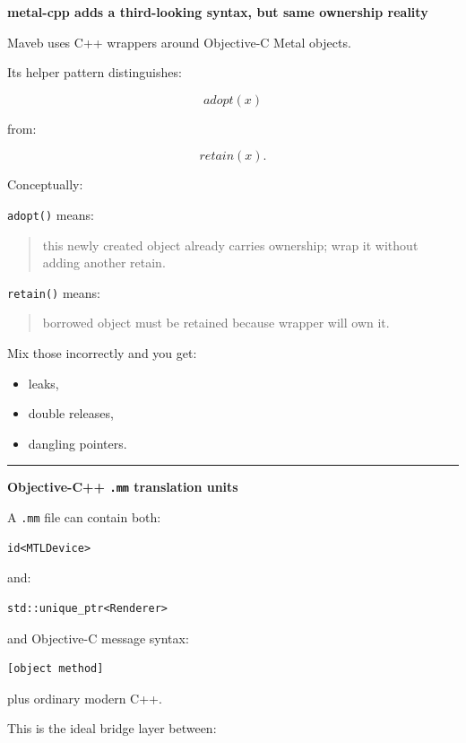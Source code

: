 \textbf{metal-cpp adds a third-looking syntax, but same ownership reality}

Maveb uses C++ wrappers around Objective-C Metal objects.

Its helper pattern distinguishes:

\[
adopt(x)
\]

from:

\[
retain(x).
\]

Conceptually:

\texttt{adopt()} means:

\begin{quote}
this newly created object already carries ownership; wrap it without adding another retain.
\end{quote}

\texttt{retain()} means:

\begin{quote}
borrowed object must be retained because wrapper will own it.
\end{quote}

Mix those incorrectly and you get:

\begin{itemize}
\tightlist
\item
  leaks,
\item
  double releases,
\item
  dangling pointers.
\end{itemize}

\begin{center}\rule{0.5\linewidth}{0.5pt}\end{center}

\textbf{Objective-C++ \texttt{.mm} translation units}

A \texttt{.mm} file can contain both:

\begin{verbatim}
id<MTLDevice>
\end{verbatim}

and:

\begin{verbatim}
std::unique_ptr<Renderer>
\end{verbatim}

and Objective-C message syntax:

\begin{verbatim}
[object method]
\end{verbatim}

plus ordinary modern C++.

This is the ideal bridge layer between:

